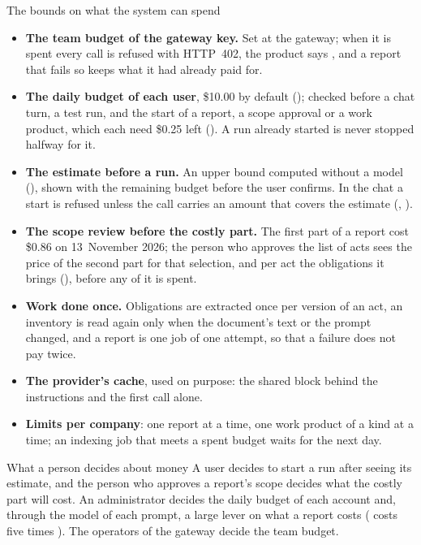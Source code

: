 \begin{codebox}{The bounds on what the system can spend}
\begin{itemize}
  \item \textbf{The team budget of the gateway key.} Set at the gateway; when it is spent
    every call is refused with HTTP~402, the product says , and a
    report that fails so keeps what it had already paid for.
  \item \textbf{The daily budget of each user}, \$10.00 by default
    (); checked before a chat turn, a test run, and the start of a
    report, a scope approval or a work product, which each need \$0.25 left
    (). A run already started is never stopped halfway for it.
  \item \textbf{The estimate before a run.} An upper bound computed without a model
    (), shown with the remaining budget before the user confirms.
    In the chat a start is refused unless the call carries an amount that covers the estimate
    (, ).
  \item \textbf{The scope review before the costly part.} The first part of a report cost
    \$0.86 on 13~November 2026; the person who approves the list of acts sees the price of the
    second part for that selection, and per act the obligations it brings
    (), before any of it is spent.
  \item \textbf{Work done once.} Obligations are extracted once per version of an act, an
    inventory is read again only when the document's text or the prompt changed, and a
    report is one job of one attempt, so that a failure does not pay twice.
  \item \textbf{The provider's cache}, used on purpose: the shared block behind the
    instructions and the first call alone.
  \item \textbf{Limits per company}: one report at a time, one work product of a kind at a
    time; an indexing job that meets a spent budget waits for the next day.
\end{itemize}
\end{codebox}

\begin{humanbox}{What a person decides about money}
A user decides to start a run after seeing its estimate, and the person who approves a
report's scope decides what the costly part will cost. An administrator decides the daily
budget of each account and, through the model of each prompt, a large lever on what a
report costs ( costs five times ). The operators of the gateway decide the team budget.
\end{humanbox}


